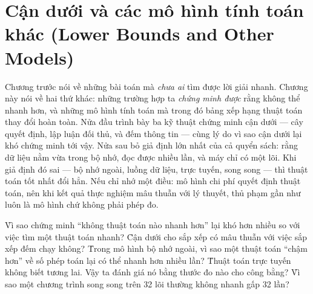 \documentclass[../../algorithm.tex]{subfiles}
\begin{document}
\chapter{Cận dưới và các mô hình tính toán khác (Lower Bounds and Other Models)}

\begin{tomtat}
Chương trước nói về những bài toán mà \emph{chưa ai} tìm được lời giải nhanh. Chương này nói về hai thứ khác: những trường hợp ta \emph{chứng minh được} rằng không thể nhanh hơn, và những mô hình tính toán mà trong đó bảng xếp hạng thuật toán thay đổi hoàn toàn. Nửa đầu trình bày ba kỹ thuật chứng minh cận dưới --- cây quyết định, lập luận đối thủ, và đếm thông tin --- cùng lý do vì sao cận dưới lại khó chứng minh tới vậy. Nửa sau bỏ giả định lớn nhất của cả quyển sách: rằng dữ liệu nằm vừa trong bộ nhớ, đọc được nhiều lần, và máy chỉ có một lõi. Khi giả định đó sai --- bộ nhớ ngoài, luồng dữ liệu, trực tuyến, song song --- thì thuật toán tốt nhất đổi hẳn. Nếu chỉ nhớ một điều: mô hình chi phí quyết định thuật toán, nên khi kết quả thực nghiệm mâu thuẫn với lý thuyết, thủ phạm gần như luôn là mô hình chứ không phải phép đo.
\end{tomtat}

\begin{nentang}
\end{nentang}

\begin{khoigoi}
\h{Vì sao chứng minh ``không thuật toán nào nhanh hơn'' lại khó hơn nhiều so với việc tìm một thuật toán nhanh?}
\h{Cận dưới  cho sắp xếp có mâu thuẫn với việc sắp xếp đếm chạy  không?}
\h{Trong mô hình bộ nhớ ngoài, vì sao một thuật toán ``chậm hơn'' về số phép toán lại có thể nhanh hơn nhiều lần?}
\h{Thuật toán trực tuyến không biết tương lai. Vậy ta đánh giá nó bằng thước đo nào cho công bằng?}
\h{Vì sao một chương trình song song trên 32 lõi thường không nhanh gấp 32 lần?}
\end{khoigoi}
\end{document}
